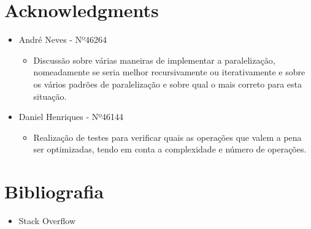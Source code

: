 \documentclass[a4paper]{article}
\begin{document}
    \section{Acknowledgments}
    \begin{itemize}
    \item André Neves - Nº46264
    \begin{itemize}
    \item Discussão sobre várias maneiras de implementar a paralelização, nomeadamente se seria melhor recursivamente ou iterativamente e sobre os vários padrões de paralelização e sobre qual o mais correto para esta situação.
    \end{itemize}
    \item Daniel Henriques - Nº46144
    \begin{itemize}
    \item Realização de testes para verificar quais as operações que valem a pena ser optimizadas, tendo em conta a complexidade e número de operações.
    \end{itemize}
    
    \end{itemize}
    
    \section{Bibliografia}
    \begin{itemize}
    \item Stack Overflow
    \end{itemize}
    
    
\end{document}
